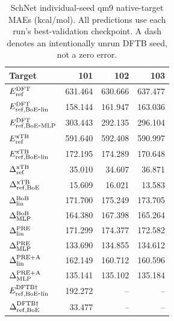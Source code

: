 \begin{table}[H]
\centering
\scriptsize
\setlength{\tabcolsep}{4pt}
\renewcommand{\arraystretch}{1.35}
\caption{SchNet individual-seed qm9 native-target MAEs (kcal/mol). All predictions use each run's best-validation checkpoint. A dash denotes an intentionally unrun DFTB seed, not a zero error.}
\begin{tabular}{lrrr}
\toprule
Target & 101 & 102 & 103 \\
\midrule
\(E_{\rm ref}^{\rm DFT}\) & 631.464 & 630.666 & 637.477 \\
\(E_{\rm ref,BoE\mbox{-}lin}^{\rm DFT}\) & 158.144 & 161.947 & 163.036 \\
\(E_{\rm ref,BoE\mbox{-}MLP}^{\rm DFT}\) & 303.443 & 292.135 & 296.104 \\
\(E_{\rm ref}^{\rm xTB}\) & 591.640 & 592.408 & 590.997 \\
\(E_{\rm ref,BoE\mbox{-}lin}^{\rm xTB}\) & 172.195 & 174.289 & 170.648 \\
\(\Delta^{\rm xTB}_{\rm ref}\) & 35.010 & 34.607 & 36.871 \\
\(\Delta^{\rm xTB}_{\rm ref,BoE}\) & 15.609 & 16.021 & 13.583 \\
\(\Delta^{\rm BoB}_{\rm lin}\) & 171.700 & 175.249 & 173.705 \\
\(\Delta^{\rm BoB}_{\rm MLP}\) & 164.380 & 167.398 & 165.264 \\
\(\Delta^{\rm PRE}_{\rm lin}\) & 171.299 & 174.377 & 172.582 \\
\(\Delta^{\rm PRE}_{\rm MLP}\) & 133.690 & 134.855 & 134.612 \\
\(\Delta^{\rm PRE+A}_{\rm lin}\) & 162.149 & 160.712 & 160.596 \\
\(\Delta^{\rm PRE+A}_{\rm MLP}\) & 135.141 & 135.102 & 135.184 \\
\(E_{\rm ref,BoE\mbox{-}lin}^{\rm DFTB\dagger}\) & 192.272 & -- & -- \\
\(\Delta^{\rm DFTB\dagger}_{\rm ref,BoE}\) & 33.477 & -- & -- \\
\bottomrule
\end{tabular}
\end{table}
